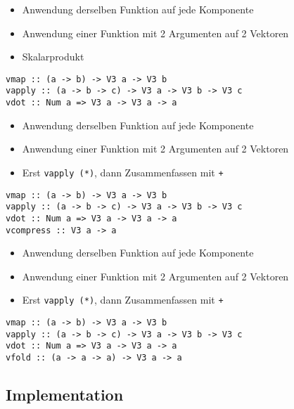 \documentclass{beamer}
\begin{document}
\begin{frame}[fragile]
\begin{overprint}
\begin{itemize}
 \item Anwendung derselben Funktion auf jede Komponente
 \item Anwendung einer Funktion mit 2 Argumenten auf 2 Vektoren
 \item Skalarprodukt
\end{itemize}
\begin{verbatim}
vmap :: (a -> b) -> V3 a -> V3 b
vapply :: (a -> b -> c) -> V3 a -> V3 b -> V3 c
vdot :: Num a => V3 a -> V3 a -> a
\end{verbatim}
\begin{itemize}
 \item Anwendung derselben Funktion auf jede Komponente
 \item Anwendung einer Funktion mit 2 Argumenten auf 2 Vektoren
 \item Erst \texttt{vapply (*)}, dann Zusammenfassen mit \texttt{+}
\end{itemize}
\begin{verbatim}
vmap :: (a -> b) -> V3 a -> V3 b
vapply :: (a -> b -> c) -> V3 a -> V3 b -> V3 c
vdot :: Num a => V3 a -> V3 a -> a
vcompress :: V3 a -> a
\end{verbatim}
\begin{itemize}
 \item Anwendung derselben Funktion auf jede Komponente
 \item Anwendung einer Funktion mit 2 Argumenten auf 2 Vektoren
 \item Erst \texttt{vapply (*)}, dann Zusammenfassen mit \texttt{+}
\end{itemize}
\begin{verbatim}
vmap :: (a -> b) -> V3 a -> V3 b
vapply :: (a -> b -> c) -> V3 a -> V3 b -> V3 c
vdot :: Num a => V3 a -> V3 a -> a
vfold :: (a -> a -> a) -> V3 a -> a
\end{verbatim}
\end{overprint}
\end{frame}

\subsection{Implementation}
\end{document}
